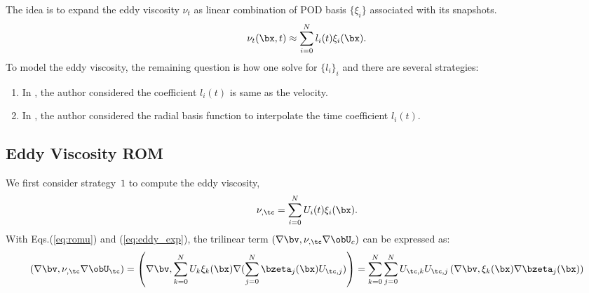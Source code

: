The idea is to expand the eddy viscosity $\nu_t$ as linear combination of POD
basis $\{\xi_i\}$ associated with its snapshots.
%
\begin{equation}
   \nu_t(\bx, t) \approx \sum^N_{i=0}l_i(t)\xi_i(\bx).
\end{equation}
%
To model the eddy viscosity, the remaining question is how one solve for
$\{l_i\}_i$ and there are several strategies:
%
\begin{enumerate} 
   \item In \cite{lorenzi2016pod}, the author considered the coefficient
$l_i(t)$ is same as the velocity.  
   \item In \cite{georgaka2020hybrid, hijazi2020data}, the author considered the
radial basis function \cite{lazzaro2002radial} to interpolate the time
coefficient $l_i(t)$.
\end{enumerate}
%

\subsection{Eddy Viscosity ROM}
We first consider strategy~$1$ to compute the eddy viscosity, 
%
\begin{equation}
   \nu_{\tt, \tc} = \sum^N_{i=0}U_i(t)\xi_i(\bx). \label{eq:eddy_exp}
\end{equation}
%
With Eqs.(\ref{eq:romu}) and (\ref{eq:eddy_exp}), the trilinear term $(\nabla
\bv, \nu_{\tt,\tc} \nabla \obU_c)$ can be expressed as:
%
\begin{equation} 
   \left(\nabla \bv , \nu_{\tt,\tc} \nabla \obU_{\tc}\right) = \left(\nabla
\bv, \sum^N_{k=0}U_k \xi_k(\bx) \nabla (\sum_{j=0}^N \bzeta_j(\bx) U_{\tc,j}) \right)
= \sum^N_{k=0} \sum_{j=0}^N U_{\tc,k} U_{\tc,j} \left(\nabla \bv, \xi_k(\bx) \nabla
\bzeta_j(\bx) \right)
\end{equation}
%

